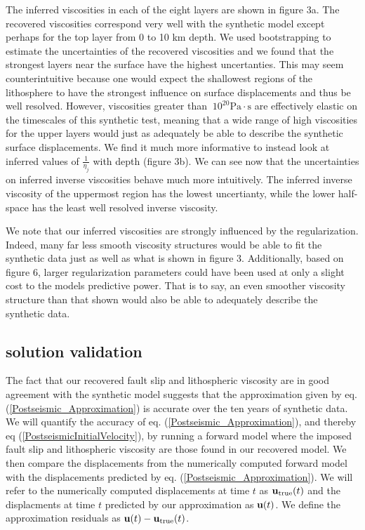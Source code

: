 \documentclass[12pt]{article}
\begin{document}
The inferred viscosities in each of the eight layers are shown in
figure 3a.  The recovered viscosities correspond very well with the
synthetic model except perhaps for the top layer from 0 to 10 km
depth.  We used bootstrapping to estimate the uncertainties of the
recovered viscosities and we found that the strongest layers
near the surface have the highest uncertanties.  This may seem
counterintuitive because one would expect the shallowest regions of
the lithosphere to have the strongest influence on surface
displacements and thus be well resolved.  However, viscosities greater
than $~10^{20} \mathrm{Pa}\cdot\mathrm{s}$ are effectively elastic on
the timescales of this synthetic test, meaning that a wide range of
high viscosities for the upper layers would just as adequately be able
to describe the synthetic surface displacements.  We find it much more
informative to instead look at inferred values of $\frac{1}{\eta_j}$ with
depth (figure 3b).  We can see now that the uncertainties on inferred
inverse viscosities behave much more intuitively.  The inferred inverse
viscosity of the uppermost region has the lowest uncertianty, while
the lower half-space has the least well resolved inverse viscosity.

We note that our inferred viscosities are strongly influenced by the
regularization.  Indeed, many far less smooth viscosity structures
would be able to fit the synthetic data just as well as what is shown
in figure 3.  Additionally, based on figure 6, larger regularization
parameters could have been used at only a slight cost to the models
predictive power.  That is to say, an even smoother viscosity
structure than that shown would also be able to adequately describe the
synthetic data.

\subsection{solution validation}
The fact that our recovered fault slip and lithospheric viscosity are
in good agreement with the synthetic model suggests that the
approximation given by eq. (\ref{Postseismic_Approximation}) is
accurate over the ten years of synthetic data.  We will quantify the
accuracy of eq. (\ref{Postseismic_Approximation}), and thereby eq
(\ref{PostseismicInitialVelocity}), by running a forward model where
the imposed fault slip and lithospheric viscosity are those found in
our recovered model.  We then compare the displacements from the
numerically computed forward model with the displacements predicted by
eq. (\ref{Postseismic_Approximation}).  We will refer to the
numerically computed displacements at time $t$ as
$\bold{u}_{\mathrm{true}}(t)$ and the displacments at time $t$
predicted by our approximation as $\bold{u}(t)$.  We define the
approximation residuals as $\bold{u}(t) - \bold{u}_{\mathrm{true}}(t)$.
\end{document}
